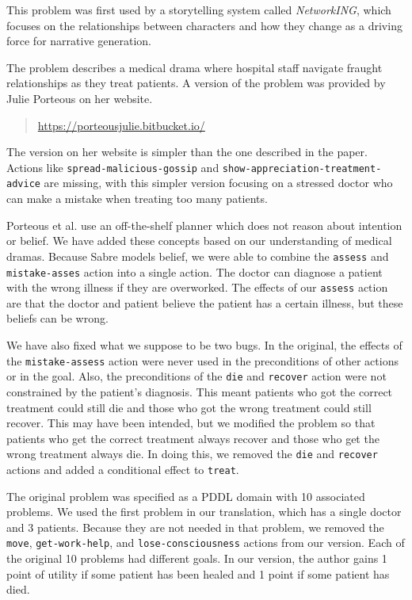 \documentclass{nilreport}
\makeatletter
\renewcommand{\bibentry}[1]{\nocite{#1}{\frenchspacing\@nameuse{BR@r@#1\@extra@b@citeb}}}
\makeatother
\begin{document}
This problem was first used by a storytelling system called \emph{NetworkING},
which focuses on the relationships between characters and how they
change as a driving force for narrative generation.

\begin{quote}
	\bibentry{porteous2013networking}
\end{quote}

\noindent The problem describes a medical drama where hospital staff
navigate fraught relationships as they treat patients. A version of
the problem was provided by Julie Porteous on her website.

\begin{quote}
	\url{https://porteousjulie.bitbucket.io/}
\end{quote}

\noindent The version on her website is simpler than the one described
in the paper. Actions like \texttt{spread-malicious-gossip} and \texttt{show-appreciation-treatment-advice}
are missing, with this simpler version focusing on a stressed doctor
who can make a mistake when treating too many patients.

Porteous et al. use an off-the-shelf planner which does not reason
about intention or belief. We have added these concepts based on our
understanding of medical dramas. Because Sabre models belief, we were
able to combine the \texttt{assess} and \texttt{mistake-asses} action
into a single action. The doctor can diagnose a patient with the wrong
illness if they are overworked. The effects of our \texttt{assess}
action are that the doctor and patient believe the patient has a certain
illness, but these beliefs can be wrong.

We have also fixed what we suppose to be two bugs. In the original,
the effects of the \texttt{mistake-assess} action were never used
in the preconditions of other actions or in the goal. Also, the preconditions
of the \texttt{die} and \texttt{recover} action were not constrained
by the patient's diagnosis. This meant patients who got the correct
treatment could still die and those who got the wrong treatment could
still recover. This may have been intended, but we modified the problem
so that patients who get the correct treatment always recover and
those who get the wrong treatment always die. In doing this, we removed
the \texttt{die} and \texttt{recover} actions and added a conditional
effect to \texttt{treat}.

The original problem was specified as a PDDL domain with 10 associated
problems. We used the first problem in our translation, which has
a single doctor and 3 patients. Because they are not needed in that
problem, we removed the \texttt{move}, \texttt{get-work-help}, and
\texttt{lose-consciousness} actions from our version. Each of the
original 10 problems had different goals. In our version, the author
gains 1 point of utility if some patient has been healed and 1 point
if some patient has died.
\end{document}
